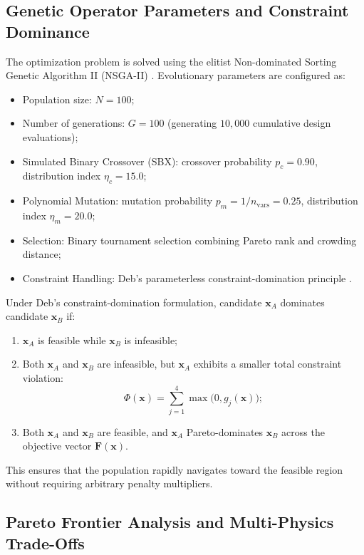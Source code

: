 \subsection{Genetic Operator Parameters and Constraint Dominance}

The optimization problem is solved using the elitist Non-dominated Sorting Genetic Algorithm II (NSGA-II) \cite{deb2002}. Evolutionary parameters are configured as:
\begin{itemize}
\item Population size: $N = 100$;
\item Number of generations: $G = 100$ (generating $10{,}000$ cumulative design evaluations);
\item Simulated Binary Crossover (SBX): crossover probability $p_c = 0.90$, distribution index $\eta_c = 15.0$;
\item Polynomial Mutation: mutation probability $p_m = 1/n_{\text{vars}} = 0.25$, distribution index $\eta_m = 20.0$;
\item Selection: Binary tournament selection combining Pareto rank and crowding distance;
\item Constraint Handling: Deb's parameterless constraint-domination principle \cite{deb2002}.
\end{itemize}

Under Deb's constraint-domination formulation, candidate $\mathbf{x}_A$ dominates candidate $\mathbf{x}_B$ if:
\begin{enumerate}
\item $\mathbf{x}_A$ is feasible while $\mathbf{x}_B$ is infeasible;
\item Both $\mathbf{x}_A$ and $\mathbf{x}_B$ are infeasible, but $\mathbf{x}_A$ exhibits a smaller total constraint violation:
\begin{equation}
\Phi(\mathbf{x}) = \sum_{j=1}^4 \max\big(0, g_j(\mathbf{x})\big);
\end{equation}
\item Both $\mathbf{x}_A$ and $\mathbf{x}_B$ are feasible, and $\mathbf{x}_A$ Pareto-dominates $\mathbf{x}_B$ across the objective vector $\mathbf{F}(\mathbf{x})$.
\end{enumerate}
This ensures that the population rapidly navigates toward the feasible region without requiring arbitrary penalty multipliers.

\subsection{Pareto Frontier Analysis and Multi-Physics Trade-Offs}

